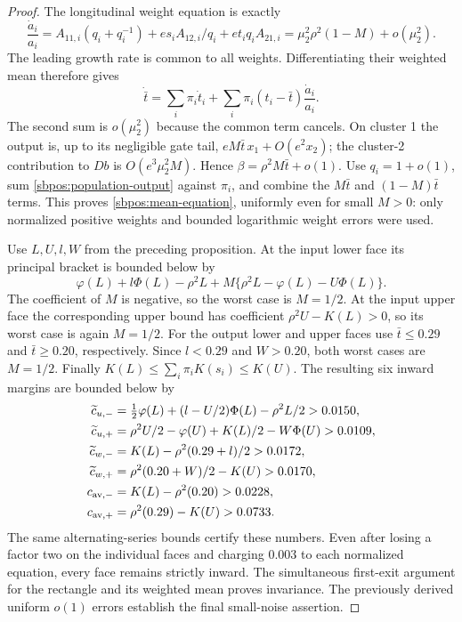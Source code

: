 \documentclass{article} %
\theoremstyle{plain}
\theoremstyle{definition}
\theoremstyle{remark}
\begin{document}
\begin{proof}
The longitudinal weight equation is exactly
\[
 \frac{\dot a_i}{a_i}
   =A_{11,i}(q_i+q_i^{-1})
       +e s_iA_{12,i}/q_i+e t_iq_iA_{21,i}
   =\mu_2^2\rho^2(1-M)+o(\mu_2^2).
\]
The leading growth rate is common to all weights. Differentiating their
weighted mean therefore gives
\[
 \dot{\bar t}=\sum_i\pi_i\dot t_i+
  \sum_i\pi_i(t_i-\bar t)\frac{\dot a_i}{a_i}.
\]
The second sum is $o(\mu_2^2)$ because the common term cancels.
On cluster 1 the output is, up to its negligible gate tail,
$eM\bar t\,x_1+O(e^2x_2)$; the cluster-2 contribution to $Db$ is
$O(e^3\mu_2^2M)$. Hence
$\beta=\rho^2M\bar t+o(1)$.
Use $q_i=1+o(1)$, sum \eqref{sbpos:population-output} against
$\pi_i$, and combine the $M\bar t$ and $(1-M)\bar t$ terms.
This proves \eqref{sbpos:mean-equation}, uniformly even for small $M>0$:
only normalized positive weights and bounded logarithmic weight errors
were used.

Use $L,U,l,W$ from the preceding proposition. At the input lower face
its principal bracket is bounded below by
\[
 \varphi(L)+l\Phi(L)-\rho^2L
      +M\{\rho^2L-\varphi(L)-U\Phi(L)\}.
\]
The coefficient of $M$ is negative, so the worst case is $M=1/2$.
At the input upper face the corresponding upper bound has coefficient
$\rho^2U-K(L)>0$, so its worst case is again $M=1/2$.
For the output lower and upper faces use $\bar t\le0.29$ and
$\bar t\ge0.20$, respectively. Since $l<0.29$ and $W>0.20$,
both worst cases are $M=1/2$.
Finally $K(L)\le\sum_i\pi_iK(s_i)\le K(U)$.
The resulting six inward margins are bounded below by
\begin{align*}
 \widetilde c_{u,-}
 &=\tfrac12\varphi(L)+(l-U/2)\Phi(L)-\rho^2L/2>0.0150,\\
 \widetilde c_{u,+}
 &=\rho^2U/2-\varphi(U)+K(L)/2-W\Phi(U)>0.0109,\\
 \widetilde c_{w,-}&=K(L)-\rho^2(0.29+l)/2>0.0172,\\
 \widetilde c_{w,+}&=\rho^2(0.20+W)/2-K(U)>0.0170,\\
 c_{{\rm av},-}&=K(L)-\rho^2(0.20)>0.0228,\\
 c_{{\rm av},+}&=\rho^2(0.29)-K(U)>0.0733.
\end{align*}
The same alternating-series bounds certify these numbers. Even after
losing a factor two on the individual faces and charging $0.003$ to
each normalized equation, every face remains strictly inward.
The simultaneous first-exit argument for the rectangle and its weighted
mean proves invariance. The previously derived uniform $o(1)$ errors
establish the final small-noise assertion.
\end{proof}
\end{document}
